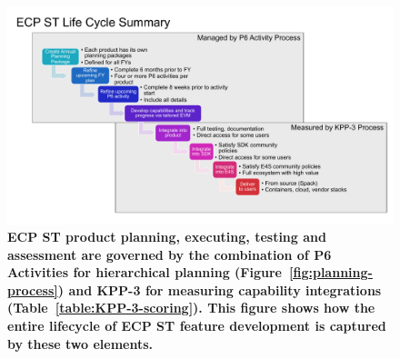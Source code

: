 \begin{figure}
	\centering
	\includegraphics[width=0.9\linewidth]{E4S-Lifecycle}
	\caption{\textbf{ECP ST product planning, executing, testing and assessment are governed by the combination of P6 Activities for hierarchical planning (Figure~\ref{fig:planning-process}) and KPP-3 for measuring capability integrations (Table~\ref{table:KPP-3-scoring}).  This figure shows how the entire lifecycle of ECP ST feature development is captured by these two elements.}}
	\label{fig:lifecycle}
\end{figure}


